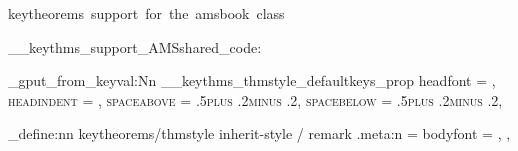   {keytheorems~support~for~the~amsbook~class}

\__keythms_support_AMSshared_code:

\prop_gput_from_keyval:Nn \g__keythms_thmstyle_defaultkeys_prop
  {
    headfont      = \scshape,
    headindent    = \parindent,
    spaceabove    = .5\baselineskip plus .2\baselineskip minus .2\baselineskip,
    spacebelow    = .5\baselineskip plus .2\baselineskip minus .2\baselineskip,
  }

\keys_define:nn { keytheorems/thmstyle }
  {
    inherit-style / remark .meta:n =
      {
        bodyfont = \normalfont,
      },
  }